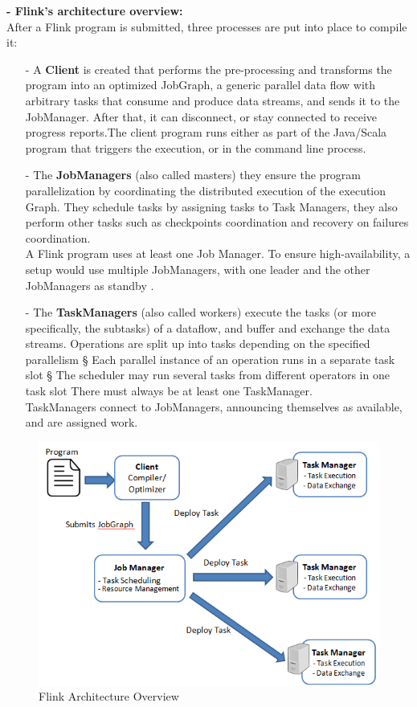 \textbf{- Flink's architecture overview:}\\
After a Flink program is submitted, three processes are put into place to compile it:
\begin{itemize}
\item[-]  A \textbf{Client} is created that performs the pre-processing and transforms the program into an optimized JobGraph, a generic parallel data flow with arbitrary tasks that consume and produce data streams, and sends it to  the JobManager. After that, it can disconnect, or stay connected to receive progress reports.The client program runs either as part of the Java/Scala program that triggers the execution, or in the command line process. 
\item[-] 	The \textbf{JobManagers} (also called masters) they ensure the program parallelization by coordinating the distributed execution of the execution Graph. They schedule tasks by assigning tasks to Task Managers, they also perform other tasks such as checkpoints coordination and recovery on failures coordination.\\
A Flink program uses at least one Job Manager. To ensure high-availability, a setup would use multiple JobManagers, with one leader and the other JobManagers as standby .
\item[-] 	The \textbf{TaskManagers} (also called workers) execute the tasks (or more specifically, the subtasks) of a dataflow, and buffer and exchange the data streams.
Operations are split up into tasks depending on the specified parallelism § Each parallel instance of an operation runs in a separate task slot § The scheduler may run several tasks from different operators in one task slot
There must always be at least one TaskManager. \\
 TaskManagers connect to JobManagers, announcing themselves as available, and are assigned work.\\
\end{itemize} 
			\begin{figure}[h!]
					\centering
					\includegraphics[scale=0.7]{graphics/compilation.PNG} 
					\caption{Flink Architecture Overview} \label{archi} 
			\end{figure}
				

